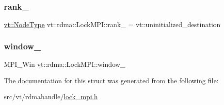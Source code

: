 \mbox{\label{structvt_1_1rdma_1_1_lock_m_p_i_a3f0c17bedbb2630d78cff51ba4c096ae}} 
\subsubsection{\texorpdfstring{rank\+\_\+}{rank\_}}
{\footnotesize\ttfamily \hyperlink{namespacevt_a866da9d0efc19c0a1ce79e9e492f47e2}{vt\+::\+Node\+Type} vt\+::rdma\+::\+Lock\+M\+P\+I\+::rank\+\_\+ = vt\+::uninitialized\+\_\+destination\hspace{0.3cm}{\ttfamily [private]}}

\mbox{\label{structvt_1_1rdma_1_1_lock_m_p_i_a641c0b10028472abe859317c94a1c511}} 
\subsubsection{\texorpdfstring{window\+\_\+}{window\_}}
{\footnotesize\ttfamily M\+P\+I\+\_\+\+Win vt\+::rdma\+::\+Lock\+M\+P\+I\+::window\+\_\+\hspace{0.3cm}{\ttfamily [private]}}



The documentation for this struct was generated from the following file\+:\begin{DoxyCompactItemize}
\item 
src/vt/rdmahandle/\hyperlink{lock__mpi_8h}{lock\+\_\+mpi.\+h}\end{DoxyCompactItemize}

